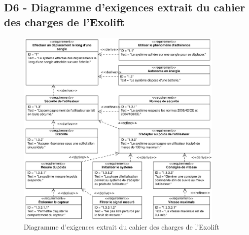 %
%
%
%
%
%
%
%
%

\FloatBarrier

\ifprof

\else
\subsection{D6 - Diagramme d'exigences extrait du cahier des charges de l'Exolift}

\begin{figure}[!htb]
\begin{center}
\includegraphics[width=0.9\textwidth]{images/2023_10_30_d11e80da56f59e3b3cdfg-20}
\caption{Diagramme d'exigences extrait du cahier des charges de l'Exolift \label{DR6}}
\end{center}
\end{figure}

\fi

